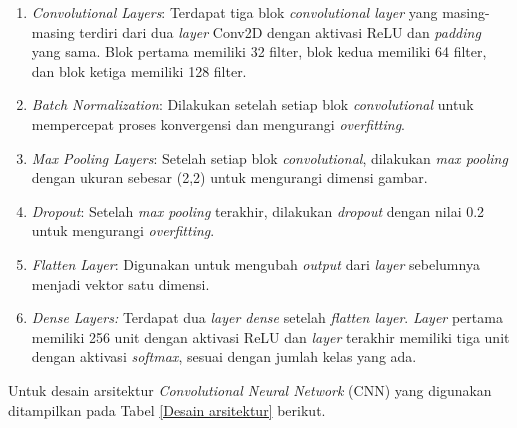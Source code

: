     \begin{enumerate}
        \item     \textit{Convolutional Layers}: Terdapat tiga blok \textit{convolutional layer} yang masing-masing terdiri dari dua \textit{layer} Conv2D dengan aktivasi ReLU dan \textit{padding} yang sama. Blok pertama memiliki 32 filter, blok kedua memiliki 64 filter, dan blok ketiga memiliki 128 filter.
    
        \item  \textit{Batch Normalization}: Dilakukan setelah setiap blok \textit{convolutional }untuk mempercepat proses konvergensi dan mengurangi \textit{overfitting}.
    
        \item \textit{Max Pooling Layers}: Setelah setiap blok \textit{convolutional}, dilakukan \textit{max pooling} dengan ukuran sebesar (2,2) untuk mengurangi dimensi gambar.
    
       \item  \textit{Dropout}: Setelah \textit{max pooling} terakhir, dilakukan \textit{dropout} dengan nilai 0.2 untuk mengurangi \textit{overfitting}.
    
        \item \textit{Flatten Layer}: Digunakan untuk mengubah \textit{output} dari \textit{layer} sebelumnya menjadi vektor satu dimensi.
    
        \item \textit{Dense Layers:} Terdapat dua \textit{layer dense} setelah \textit{flatten layer}. \textit{Layer} pertama memiliki 256 unit dengan aktivasi ReLU dan \textit{layer} terakhir memiliki tiga unit dengan aktivasi \textit{softmax}, sesuai dengan jumlah kelas yang ada.

    \end{enumerate}

    Untuk desain arsitektur \textit{Convolutional Neural Network} (CNN) yang digunakan ditampilkan pada Tabel 
    \ref{Desain arsitektur} berikut.

    

